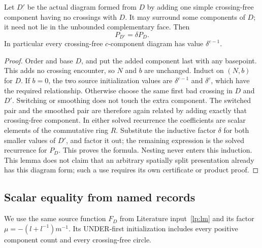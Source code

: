 \begin{lemma}\label{lp:split-circle}
Let $D'$ be the actual diagram formed from $D$ by adding one simple
crossing-free component having no crossings with $D$. It may surround
some components of $D$; it need not lie in the unbounded complementary
face. Then
\begin{equation}\label{lp:split}
 P_{D'}=\delta P_D.
\end{equation}
In particular every crossing-free $c$-component diagram has value
$\delta^{c-1}$.
\end{lemma}
\begin{proof}
Order and base $D$, and put the added component last with any basepoint.
This adds no crossing encounter, so $N$ and $b$ are unchanged. Induct on
$(N,b)$ for $D$. If $b=0$, the two source initialization values are
$\delta^{c-1}$ and $\delta^c$, which have the required relationship.
Otherwise choose the same first bad crossing in $D$ and $D'$. Switching
or smoothing does not touch the extra component. The switched pair and
the smoothed pair are therefore again related by adding exactly that
crossing-free component. In either solved recurrence the coefficients
are scalar elements of the commutative ring $R$. Substitute the inductive
factor $\delta$ for both smaller values of $D'$, and factor it out; the
remaining expression is the solved recurrence for $P_D$. This proves
the formula. Nesting never enters this induction. This lemma does not
claim that an arbitrary spatially split presentation already has this
diagram form; such a use requires its own certificate or product proof.
\end{proof}

\subsection{Scalar equality from named records}

We use the same source function $F_D$ from Literature input~\ref{lp:lm}
and its factor $\mu=-(l+l^{-1})m^{-1}$. Its UNDER-first initialization
includes every positive component count and every crossing-free circle.

